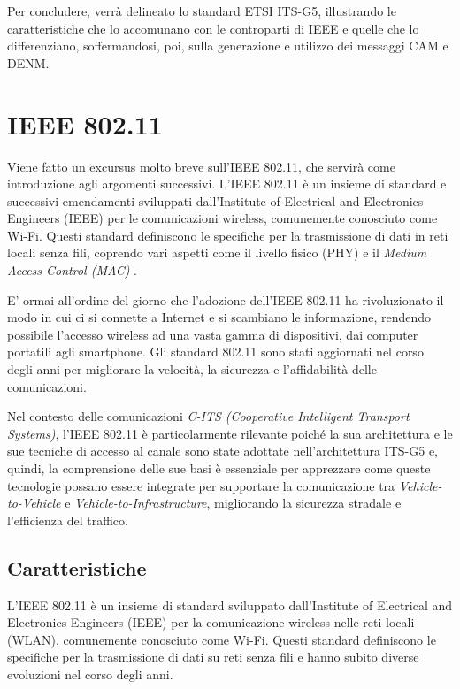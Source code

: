 Per concludere, verrà delineato lo standard ETSI ITS-G5, illustrando le caratteristiche che lo accomunano con le controparti di IEEE e quelle che lo differenziano, soffermandosi, poi, sulla generazione e utilizzo dei messaggi CAM e DENM.

\section{IEEE 802.11}
Viene fatto un excursus molto breve sull'IEEE 802.11, che servirà come introduzione agli argomenti successivi. L'IEEE 802.11 è un insieme di standard e successivi emendamenti sviluppati dall'Institute of Electrical and Electronics Engineers (IEEE) per le comunicazioni wireless, comunemente conosciuto come Wi-Fi. Questi standard definiscono le specifiche per la trasmissione di dati in reti locali senza fili, coprendo vari aspetti come il livello fisico (PHY) e il \textit{Medium Access Control (MAC)} \cite{ieee80211}.

E' ormai all'ordine del giorno che l'adozione dell'IEEE 802.11 ha rivoluzionato il modo in cui ci si connette a Internet e si scambiano le informazione, rendendo possibile l'accesso wireless ad una vasta gamma di dispositivi, dai computer portatili agli smartphone. Gli standard 802.11 sono stati aggiornati nel corso degli anni per migliorare la velocità, la sicurezza e l'affidabilità delle comunicazioni.

Nel contesto delle comunicazioni \textit{C-ITS (Cooperative Intelligent Transport Systems)}, l'IEEE 802.11 è particolarmente rilevante poiché la sua architettura e le sue tecniche di accesso al canale sono state adottate nell'architettura ITS-G5 \cite{etsi302} e, quindi, la comprensione delle sue basi è essenziale per apprezzare come queste tecnologie possano essere integrate per supportare la comunicazione tra \textit{Vehicle-to-Vehicle} e \textit{Vehicle-to-Infrastructure}, migliorando la sicurezza stradale e l'efficienza del traffico.

\subsection[Caratteristiche]{Caratteristiche}
L'IEEE 802.11 è un insieme di standard sviluppato dall'Institute of Electrical and Electronics Engineers (IEEE) per la comunicazione wireless nelle reti locali (WLAN), comunemente conosciuto come Wi-Fi. Questi standard definiscono le specifiche per la trasmissione di dati su reti senza fili e hanno subito diverse evoluzioni nel corso degli anni.

